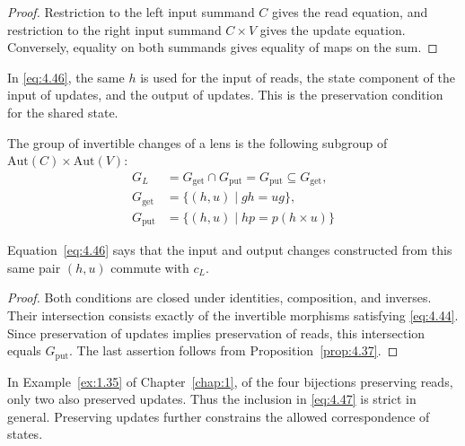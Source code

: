 \begin{proof}

Restriction to the left input summand $C$ gives the read equation, and restriction
to the right input summand $C\times V$ gives the update equation.
Conversely, equality on both summands gives equality of maps on the sum.

\end{proof}

In \eqref{eq:4.46}, the same $h$ is used for the input of reads, the state
component of the input of updates, and the output of updates.
This is the preservation condition for the shared state.

\begin{proposition}\label{prop:4.38}

The group of invertible changes of a lens is the following subgroup of
$\mathrm{Aut}(C)\times\mathrm{Aut}(V)$:
\begin{equation*}
\begin{aligned}
G_L
 &=G_{\mathrm{get}}\cap G_{\mathrm{put}}
 =G_{\mathrm{put}}\subseteq G_{\mathrm{get}},\\
G_{\mathrm{get}}&=\{(h,u)\mid gh=ug\},\\
G_{\mathrm{put}}&=\{(h,u)\mid hp=p(h\times u)\}
\end{aligned}
\tag{4.47}\label{eq:4.47}
\end{equation*}

Equation~\eqref{eq:4.46} says that the input and output changes constructed from
this same pair $(h,u)$ commute with $c_L$.

\end{proposition}

\begin{proof}

Both conditions are closed under identities, composition, and inverses.
Their intersection consists exactly of the invertible morphisms satisfying
\eqref{eq:4.44}. Since preservation of updates implies preservation of reads,
this intersection equals $G_{\mathrm{put}}$.
The last assertion follows from Proposition~\ref{prop:4.37}.

\end{proof}

In Example~\ref{ex:1.35} of Chapter~\ref{chap:1}, of the four bijections
preserving reads, only two also preserved updates.
Thus the inclusion in \eqref{eq:4.47} is strict in general.
Preserving updates further constrains the allowed correspondence of states.

